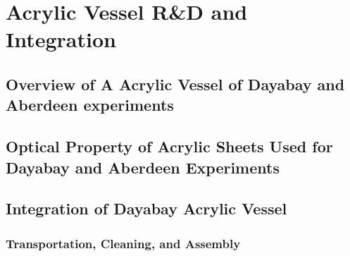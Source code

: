 \chapter {Acrylic Vessel R\&D and Integration}

\section {Overview of A Acrylic Vessel of Dayabay and Aberdeen experiments}

\section {Optical Property of Acrylic Sheets Used for Dayabay and Aberdeen Experiments}

\section {Integration of Dayabay Acrylic Vessel}

\subsection {Transportation, Cleaning, and Assembly}
